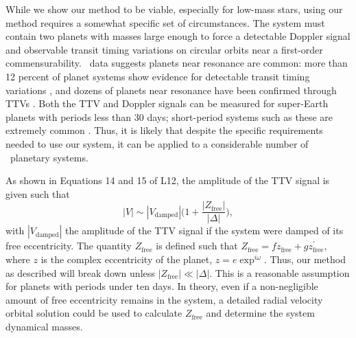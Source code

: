 While we show our method to be viable, especially for low-mass stars, using our method requires a somewhat specific set of circumstances. The system must contain two planets with masses large enough to force a detectable Doppler signal and observable transit timing variations on circular orbits near a first-order commensurability. \kep\ data suggests planets near resonance are common: more than 12 percent of planet systems show evidence for detectable transit timing variations \citep{Ford12a}, and dozens of planets near resonance have been confirmed through TTVs \citep{Steffen13}. Both the TTV and Doppler signals can be measured for super-Earth planets with periods less than 30 days; short-period systems such as these are extremely common \citep{Howard12}. Thus, it is likely that despite the specific requirements needed to use our system, it can be applied to a considerable number of \kep\ planetary systems.

As shown in Equations 14 and 15 of L12, the amplitude of the TTV signal is given such that
\begin{equation}
|V| \sim |V_\textrm{damped}|\bigg(1 + \frac{|Z_\textrm{free}|}{|\Delta|}\bigg),
\end{equation}
with $|V_\textrm{damped}|$ the amplitude of the TTV signal if the system were damped of its free eccentricity. The quantity $Z_\textrm{free}$ is defined such that $Z_\textrm{free} = f z_\textrm{free} + g z^\prime_\textrm{free}$, where $z$ is the complex eccentricity of the planet, $z = e\exp^{i \omega}$. Thus, our method as described will break down unless $|Z_{\textrm{free}}| \ll |\Delta|$. This is a reasonable assumption for planets with periods under ten days. In theory, even if a non-negligible amount of free eccentricity remains in the system, a detailed radial velocity orbital solution could be used to calculate $Z_{\textrm{free}}$ and determine the system dynamical masses.

